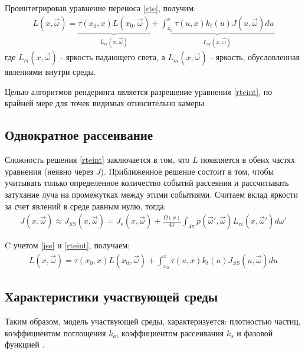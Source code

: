 Проинтегрировав уравнение переноса \eqref{rte}, получим:
\begin{equation}
	\label{rteint}
	\begin{aligned}
		L(x, \vec{\omega}) =
		\underbrace{\tau(x_0, x) L(x_0, \vec{\omega})}_{L_{ri}(x, \vec{\omega})} + \underbrace{\int_{x_0}^{x} \tau(u, x) k_t(u) J(u, \vec{\omega}) du}_{L_m(x, \vec{\omega})}
	\end{aligned}
\end{equation}
где $ L_{ri}(x, \vec{\omega}) $ - яркость падающего света, а $ L_m(x, \vec{\omega}) $ - яркость, обусловленная явлениями внутри среды. 

Целью алгоритмов рендеринга является разрешение уравнения \eqref{rteint}, по крайней мере для точек видимых относительно камеры \cite{partmedia}. 

\subsection{Однократное рассеивание}

Сложность решения \ref{rteint} заключается в том, что $L$ появляется в обеих частях уравнения (неявно через $J$). Приближенное решение состоит в том, чтобы учитывать только определенное количество событий рассеяния и рассчитывать затухание луча на промежутках между этими событиями. Считаем вклад яркости за счет явлений в среде равным нулю, тогда:
\begin{equation}
	\label{jss}
	\begin{aligned}
		J(x, \vec{\omega}) \approx J_{SS}(x, \vec{\omega}) = J_e(x, \vec{\omega}) + \frac{\Omega(x)}{4\pi} \int_{4\pi} p(\vec{\omega}', \vec{\omega}) L_{ri}(x, \vec{\omega}') d\omega'
	\end{aligned}
\end{equation}

C учетом \ref{jss} и \ref{rteint}, получаем:
\begin{equation}
	\label{rteintss}
	\begin{aligned}
		L(x, \vec{\omega}) =
		\tau(x_0, x) L(x_0, \vec{\omega}) + \int_{x_0}^{x} \tau(u, x) k_t(u) J_{SS}(u, \vec{\omega}) du
	\end{aligned}
\end{equation}

\subsection{Характеристики участвующей среды}
Таким образом, модель участвующей среды, характеризуется: плотностью частиц, коэффициентом поглощения $k_a$, коэффициентом рассеивания $k_s$ и фазовой функцией \cite{clouds}.

